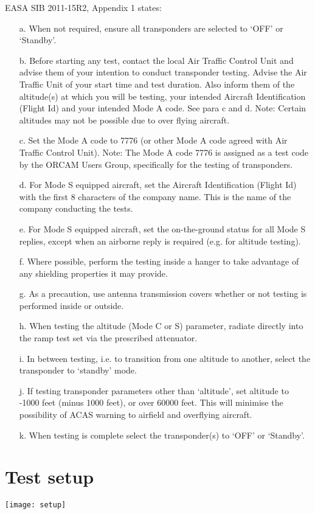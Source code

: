 \documentclass[a4paper]{article}
\begin{document}
EASA SIB 2011-15R2, Appendix 1 states:
\begin{itemize}
\item[a.]{When not required, ensure all transponders are selected to ‘OFF’ or ‘Standby’.}
\item[b.]{Before starting any test, contact the local Air Traffic Control Unit and advise them of your intention to conduct transponder testing. Advise the Air Traffic Unit of your start time and test duration. Also inform them of the altitude(s) at which you will be testing, your intended Aircraft Identification (Flight Id) and your intended Mode A code. See para c and d. Note: Certain altitudes may not be possible due to over flying aircraft.}
\item[c.]{Set the Mode A code to 7776 (or other Mode A code agreed with Air Traffic Control Unit). Note: The Mode A code 7776 is assigned as a test code by the ORCAM Users Group, specifically for the testing of transponders.}
\item[d.]{For Mode S equipped aircraft, set the Aircraft Identification (Flight Id) with the first 8 characters of the company name. This is the name of the company conducting the tests.}
\item[e.]{For Mode S equipped aircraft, set the on-the-ground status for all Mode S replies, except when an airborne reply is required (e.g. for altitude testing).}
\item[f.]{Where possible, perform the testing inside a hanger to take advantage of any shielding properties it may provide.}
\item[g.]{As a precaution, use antenna transmission covers whether or not testing is performed inside or outside.}
\item[h.]{When testing the altitude (Mode C or S) parameter, radiate directly into the ramp test set via the prescribed attenuator.}
\item[i.]{In between testing, i.e. to transition from one altitude to another, select the transponder to ‘standby’ mode.}
\item[j.]{If testing transponder parameters other than ‘altitude’, set altitude to -1000 feet (minus 1000 feet), or over 60000 feet. This will minimise the possibility of ACAS warning to airfield and overflying aircraft.}
\item[k.]{When testing is complete select the transponder(s) to ‘OFF’ or ‘Standby’.}
\end{itemize}


\section{Test setup}
\texttt{[image: setup]}



\end{document}
